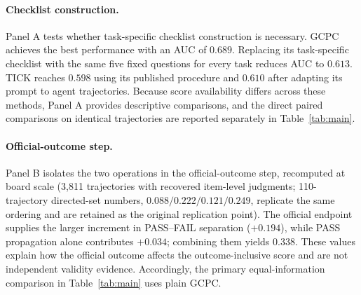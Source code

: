 \documentclass[sigconf,nonacm]{acmart}
\newcommand{\abstain}{\textsc{Abstain}}
\begin{document}
\paragraph{Checklist construction.}
Panel A tests whether task-specific checklist construction is necessary. GCPC achieves the best performance with an AUC of $0.689$. Replacing its task-specific checklist with the same five fixed questions for every task reduces AUC to $0.613$. TICK reaches $0.598$ using its published procedure and $0.610$ after adapting its prompt to agent trajectories. Because score availability differs across these methods, Panel A provides descriptive comparisons, and the direct paired comparisons on identical trajectories are reported separately in Table~\ref{tab:main}. %
\paragraph{Official-outcome step.}
Panel B isolates the two operations in the official-outcome step, recomputed
at board scale (3{,}811 trajectories with recovered item-level judgments;
110-trajectory directed-set numbers, $0.088/0.222/0.121/0.249$, replicate the
same ordering and are retained as the original replication point). The official
endpoint supplies the larger increment in PASS--FAIL separation
($+0.194$), while PASS propagation alone contributes $+0.034$; combining
them yields $0.338$. These values explain how the official outcome affects
the outcome-inclusive score and are not independent validity evidence. Accordingly,
the primary equal-information comparison in Table~\ref{tab:main} uses plain GCPC.


\end{document}
